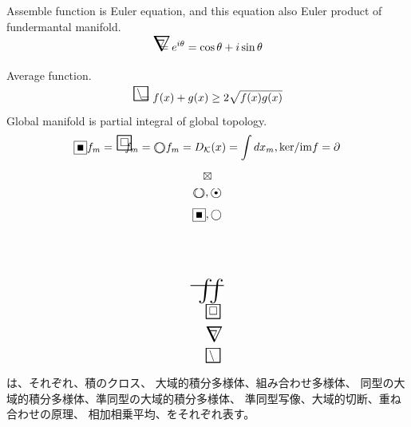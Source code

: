 \documentclass{jsarticle}
\begin{document}
  Assemble function is Euler equation, and this equation also
  Euler product of fundermantal manifold.
  $$ \whitewithnabla = e^{i\theta} = \cos \theta + i \sin \theta $$

  Average function.
  $$ \average = {{f(x) + g(x)}} \ge 2{\sqrt{f(x)g(x)}} $$
  Global manifold is partial integral of global topology.
 $$ \whitewithblacksquare f_m =  \whitewithboder \text{                 
      } f_m = 
 \whitewithbodercircle f_m = 
  D_{\mathcal{K}}(x) = \int dx_m , \mathrm{ker}/\mathrm{im}f = 
  \partial $$

$$\boxtimes$$
$$\whitewithbodercircle, \whitewithblack $$
$$\whitewithblacksquare,\whitewithwhitecircle$$
$$\scalebox{2.0}[2]{\variint}$$ 
$$\whitewithboder$$ 
$$ \whitewithnabla$$
$$\average$$ 
は、それぞれ、積のクロス、 大域的積分多様体、組み合わせ多様体、
同型の大域的積分多様体、準同型の大域的積分多様体、
準同型写像、大域的切断、重ね合わせの原理、
相加相乗平均、をそれぞれ表す。
 
\end{document}

